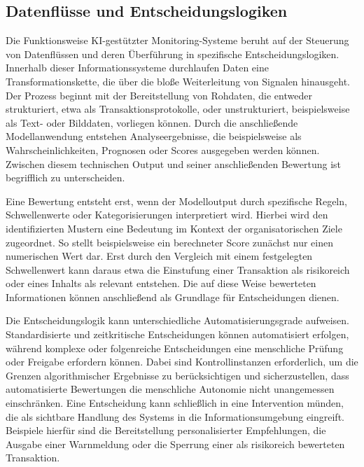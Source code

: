 \subsection{Datenflüsse und Entscheidungslogiken}

Die Funktionsweise KI-gestützter Monitoring-Systeme beruht auf der Steuerung von Datenflüssen und deren Überführung in spezifische Entscheidungslogiken. Innerhalb dieser Informationssysteme durchlaufen Daten eine Transformationskette, die über die bloße Weiterleitung von Signalen hinausgeht. Der Prozess beginnt mit der Bereitstellung von Rohdaten, die entweder strukturiert, etwa als Transaktionsprotokolle, oder unstrukturiert, beispielsweise als Text- oder Bilddaten, vorliegen können. Durch die anschließende Modellanwendung entstehen Analyseergebnisse, die beispielsweise als Wahrscheinlichkeiten, Prognosen oder Scores ausgegeben werden können. Zwischen diesem technischen Output und seiner anschließenden Bewertung ist begrifflich zu unterscheiden.

Eine Bewertung entsteht erst, wenn der Modelloutput durch spezifische Regeln, Schwellenwerte oder Kategorisierungen interpretiert wird. Hierbei wird den identifizierten Mustern eine Bedeutung im Kontext der organisatorischen Ziele zugeordnet. So stellt beispielsweise ein berechneter Score zunächst nur einen numerischen Wert dar. Erst durch den Vergleich mit einem festgelegten Schwellenwert kann daraus etwa die Einstufung einer Transaktion als risikoreich oder eines Inhalts als relevant entstehen. Die auf diese Weise bewerteten Informationen können anschließend als Grundlage für Entscheidungen dienen.

Die Entscheidungslogik kann unterschiedliche Automatisierungsgrade aufweisen. Standardisierte und zeitkritische Entscheidungen können automatisiert erfolgen, während komplexe oder folgenreiche Entscheidungen eine menschliche Prüfung oder Freigabe erfordern können. Dabei sind Kontrollinstanzen erforderlich, um die Grenzen algorithmischer Ergebnisse zu berücksichtigen und sicherzustellen, dass automatisierte Bewertungen die menschliche Autonomie nicht unangemessen einschränken. Eine Entscheidung kann schließlich in eine Intervention münden, die als sichtbare Handlung des Systems in die Informationsumgebung eingreift. Beispiele hierfür sind die Bereitstellung personalisierter Empfehlungen, die Ausgabe einer Warnmeldung oder die Sperrung einer als risikoreich bewerteten Transaktion.

